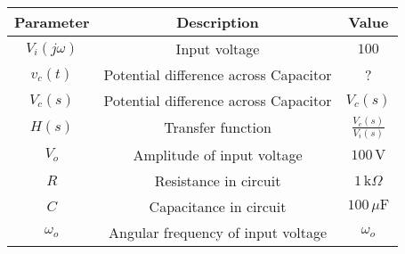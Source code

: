 \begin{tabular}{|c|c|c|}
    \hline
    \textbf{Parameter} & \textbf{Description} & \textbf{Value} \\
    \hline
    $V_i(j\omega)$ & Input voltage & $100$ \\
    \hline
    $v_c(t)$ & Potential difference across Capacitor & ? \\
    \hline
    $V_c(s)$ & Potential difference across Capacitor & $V_c(s)$ \\
    \hline
    $H(s)$ & Transfer function & $\frac{V_c(s)}{V_i(s)}$ \\
    \hline
    $V_o$ & Amplitude of input voltage & $100 \, \text{V}$ \\
    \hline
    $R$ & Resistance in circuit & $1 \, \text{k}\Omega$ \\
    \hline
    $C$ & Capacitance in circuit & $100 \, \mu\text{F}$ \\
    \hline
    $\omega_o$ & Angular frequency of input voltage & $\omega_o$ \\
    \hline
\end{tabular}

